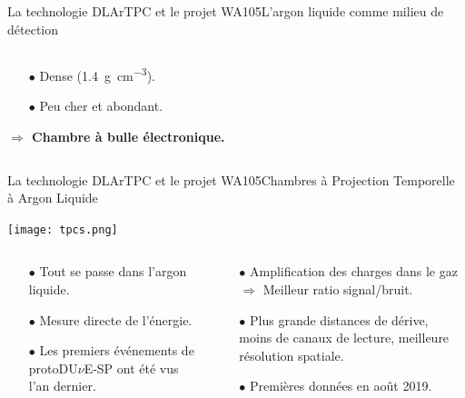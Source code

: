 \begin{frame}{La technologie DLArTPC et le projet WA105}{L'argon liquide comme milieu de détection}
\begin{scriptsize}
\begin{columns}
\begin{column}{0.4\textwidth}
\begin{itemize}
    				\item[$\bullet$] Dense (\SI{1.4}{\gram\per\centi\meter^3}).
    				\item[$\bullet$] Peu cher et abondant.
    			\end{itemize}
    			\begin{footnotesize}
	    			\textbf{$\Rightarrow$ Chambre à bulle électronique.}
	    		\end{footnotesize}
    		\end{column}
    	\end{columns}
	  \end{scriptsize}
    \end{frame}

    \begin{frame}{La technologie DLArTPC et le projet WA105}{Chambres à Projection Temporelle à Argon Liquide}
    	\begin{scriptsize}
    			\texttt{[image: tpcs.png]}\\\vfill
    			\begin{columns}
    				\begin{column}{0.5\textwidth}
    					\begin{itemize}
    						\item[$\bullet$] Tout se passe dans l'argon liquide.
    						\item[$\bullet$] Mesure directe de l'énergie.
    						\item[$\bullet$] Les premiers événements de protoDU$\nu$E-SP ont été vus l'an dernier.
    					\end{itemize}
    				\end{column}\hfill
    				\begin{column}{0.5\textwidth}
    					\begin{itemize}
    						\item[$\bullet$] Amplification des charges dans le gaz\\$\Rightarrow$ Meilleur ratio signal/bruit.
    						\item[$\bullet$] Plus grande distances de dérive, moins de canaux de lecture, meilleure résolution spatiale.
    						\item[$\bullet$] Premières données en août 2019.
    					\end{itemize}
    				\end{column}
    			\end{columns}
    	\end{scriptsize}
    \end{frame}

